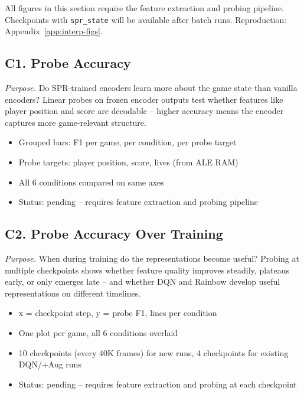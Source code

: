 \documentclass[11pt]{article}
\begin{document}
\noindent All figures in this section require the feature
extraction and probing pipeline. Checkpoints with
\texttt{spr\_state} will be available after batch runs.
Reproduction: Appendix~\ref{app:interp-figs}.

\subsection*{C1. Probe Accuracy}

\noindent\textit{Purpose.} Do SPR-trained encoders learn more
about the game state than vanilla encoders? Linear probes on
frozen encoder outputs test whether features like player position
and score are decodable -- higher accuracy means the encoder
captures more game-relevant structure.

\begin{itemize}[leftmargin=2em, itemsep=0.1em, topsep=0.3em]
  \item Grouped bars: F1 per game, per condition, per probe target
  \item Probe targets: player position, score, lives (from ALE RAM)
  \item All 6 conditions compared on same axes
  \item Status: pending -- requires feature extraction and
    probing pipeline
\end{itemize}

\vspace{0.5em}
\subsection*{C2. Probe Accuracy Over Training}

\noindent\textit{Purpose.} When during training do the
representations become useful? Probing at multiple checkpoints
shows whether feature quality improves steadily, plateaus early,
or only emerges late -- and whether DQN and Rainbow develop
useful representations on different timelines.

\begin{itemize}[leftmargin=2em, itemsep=0.1em, topsep=0.3em]
  \item x = checkpoint step, y = probe F1, lines per condition
  \item One plot per game, all 6 conditions overlaid
  \item 10 checkpoints (every 40K frames) for new runs,
    4 checkpoints for existing DQN/+Aug runs
  \item Status: pending -- requires feature extraction and
    probing at each checkpoint
\end{itemize}
\end{document}
